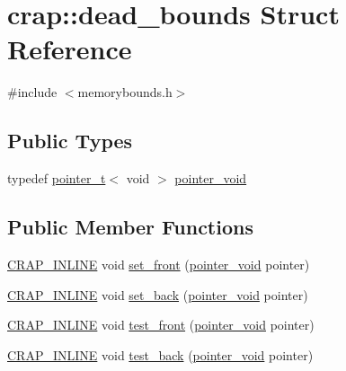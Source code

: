 \hypertarget{structcrap_1_1dead__bounds}{\section{crap\+:\+:dead\+\_\+bounds Struct Reference}
\label{structcrap_1_1dead__bounds}
}


{\ttfamily \#include $<$memorybounds.\+h$>$}

\subsection*{Public Types}
\begin{DoxyCompactItemize}
\item 
typedef \hyperlink{structcrap_1_1pointer__t}{pointer\+\_\+t}$<$ void $>$ \hyperlink{structcrap_1_1dead__bounds_a1f3c4f9646f45b9c4f1dc351d94e96bb}{pointer\+\_\+void}
\end{DoxyCompactItemize}
\subsection*{Public Member Functions}
\begin{DoxyCompactItemize}
\item 
\hyperlink{config__x86_8h_a5a40526b8d842e7ff731509998bb0f1c}{C\+R\+A\+P\+\_\+\+I\+N\+L\+I\+N\+E} void \hyperlink{structcrap_1_1dead__bounds_a1bfb142b57529ff4fe654b17d52014c2}{set\+\_\+front} (\hyperlink{structcrap_1_1dead__bounds_a1f3c4f9646f45b9c4f1dc351d94e96bb}{pointer\+\_\+void} pointer)
\item 
\hyperlink{config__x86_8h_a5a40526b8d842e7ff731509998bb0f1c}{C\+R\+A\+P\+\_\+\+I\+N\+L\+I\+N\+E} void \hyperlink{structcrap_1_1dead__bounds_a95e8c5c9645fe122540da759011f73ce}{set\+\_\+back} (\hyperlink{structcrap_1_1dead__bounds_a1f3c4f9646f45b9c4f1dc351d94e96bb}{pointer\+\_\+void} pointer)
\item 
\hyperlink{config__x86_8h_a5a40526b8d842e7ff731509998bb0f1c}{C\+R\+A\+P\+\_\+\+I\+N\+L\+I\+N\+E} void \hyperlink{structcrap_1_1dead__bounds_afd0269524e68c78f0365418e508c0012}{test\+\_\+front} (\hyperlink{structcrap_1_1dead__bounds_a1f3c4f9646f45b9c4f1dc351d94e96bb}{pointer\+\_\+void} pointer)
\item 
\hyperlink{config__x86_8h_a5a40526b8d842e7ff731509998bb0f1c}{C\+R\+A\+P\+\_\+\+I\+N\+L\+I\+N\+E} void \hyperlink{structcrap_1_1dead__bounds_aaae6140a63d70ae61887a2216bafebe4}{test\+\_\+back} (\hyperlink{structcrap_1_1dead__bounds_a1f3c4f9646f45b9c4f1dc351d94e96bb}{pointer\+\_\+void} pointer)
\end{DoxyCompactItemize}

